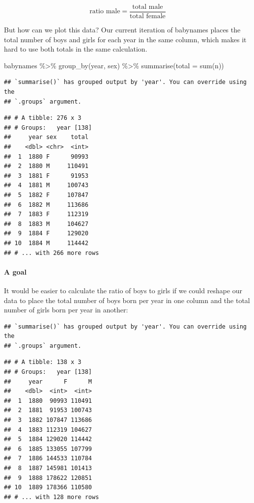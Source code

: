 \documentclass[
]{article}
\newenvironment{Shaded}{\begin{snugshade}}{\end{snugshade}}
\newcommand{\AttributeTok}[1]{\textcolor[rgb]{0.77,0.63,0.00}{#1}}
\newcommand{\FunctionTok}[1]{\textcolor[rgb]{0.00,0.00,0.00}{#1}}
\newcommand{\NormalTok}[1]{#1}
\newcommand{\SpecialCharTok}[1]{\textcolor[rgb]{0.00,0.00,0.00}{#1}}
\begin{document}
\[\mbox{ratio male}  = \frac{\mbox{total male}}{\mbox{total female}}\]

But how can we plot this data? Our current iteration of babynames places
the total number of boys and girls for each year in the same column,
which makes it hard to use both totals in the same calculation.

\begin{Shaded}
\begin{Highlighting}[]
\NormalTok{babynames }\SpecialCharTok{\%\textgreater{}\%}
  \FunctionTok{group\_by}\NormalTok{(year, sex) }\SpecialCharTok{\%\textgreater{}\%} 
  \FunctionTok{summarise}\NormalTok{(}\AttributeTok{total =} \FunctionTok{sum}\NormalTok{(n))}
\end{Highlighting}
\end{Shaded}

\begin{verbatim}
## `summarise()` has grouped output by 'year'. You can override using the
## `.groups` argument.
\end{verbatim}

\begin{verbatim}
## # A tibble: 276 x 3
## # Groups:   year [138]
##     year sex    total
##    <dbl> <chr>  <int>
##  1  1880 F      90993
##  2  1880 M     110491
##  3  1881 F      91953
##  4  1881 M     100743
##  5  1882 F     107847
##  6  1882 M     113686
##  7  1883 F     112319
##  8  1883 M     104627
##  9  1884 F     129020
## 10  1884 M     114442
## # ... with 266 more rows
\end{verbatim}

\hypertarget{a-goal}{%
\paragraph{A goal}\label{a-goal}}

It would be easier to calculate the ratio of boys to girls if we could
reshape our data to place the total number of boys born per year in one
column and the total number of girls born per year in another:

\begin{verbatim}
## `summarise()` has grouped output by 'year'. You can override using the
## `.groups` argument.
\end{verbatim}

\begin{verbatim}
## # A tibble: 138 x 3
## # Groups:   year [138]
##     year      F      M
##    <dbl>  <int>  <int>
##  1  1880  90993 110491
##  2  1881  91953 100743
##  3  1882 107847 113686
##  4  1883 112319 104627
##  5  1884 129020 114442
##  6  1885 133055 107799
##  7  1886 144533 110784
##  8  1887 145981 101413
##  9  1888 178622 120851
## 10  1889 178366 110580
## # ... with 128 more rows
\end{verbatim}
\end{document}
